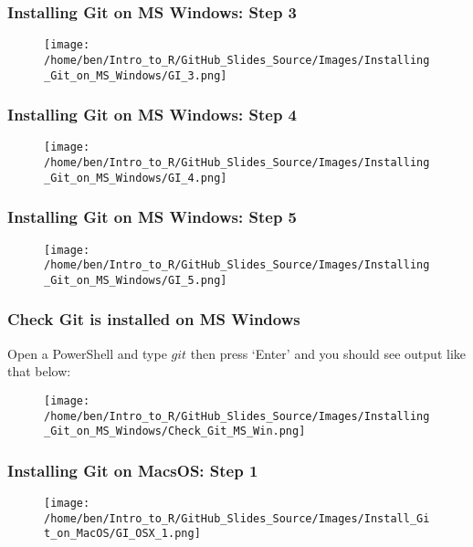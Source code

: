 \documentclass[xcolor=dvipsnames]{beamer}
\begin{document}
\begin{frame}
\frametitle{Installing Git on MS Windows: Step 3}
\begin{center}
\begin{figure}
\texttt{[image: /home/ben/Intro\_to\_R/GitHub\_Slides\_Source/Images/Installing\_Git\_on\_MS\_Windows/GI\_3.png]}
\end{figure}
\end{center}
\end{frame}

\begin{frame}
\frametitle{Installing Git on MS Windows: Step 4}
\begin{center}
\begin{figure}
\texttt{[image: /home/ben/Intro\_to\_R/GitHub\_Slides\_Source/Images/Installing\_Git\_on\_MS\_Windows/GI\_4.png]}
\end{figure}
\end{center}
\end{frame}

\begin{frame}
\frametitle{Installing Git on MS Windows: Step 5}
\begin{center}
\begin{figure}
\texttt{[image: /home/ben/Intro\_to\_R/GitHub\_Slides\_Source/Images/Installing\_Git\_on\_MS\_Windows/GI\_5.png]}
\end{figure}
\end{center}
\end{frame}

\begin{frame}
\frametitle{Check Git is installed on MS Windows}
Open a PowerShell and type $git$ then press `Enter' and you should see output like that below:\\
\begin{center}
\begin{figure}
\texttt{[image: /home/ben/Intro\_to\_R/GitHub\_Slides\_Source/Images/Installing\_Git\_on\_MS\_Windows/Check\_Git\_MS\_Win.png]}
\end{figure}
\end{center}
\end{frame}

\begin{frame}
\frametitle{Installing Git on MacsOS: Step 1}
\begin{center}
\begin{figure}
\texttt{[image: /home/ben/Intro\_to\_R/GitHub\_Slides\_Source/Images/Install\_Git\_on\_MacOS/GI\_OSX\_1.png]}
\end{figure}
\end{center}
\end{frame}
\end{document}
